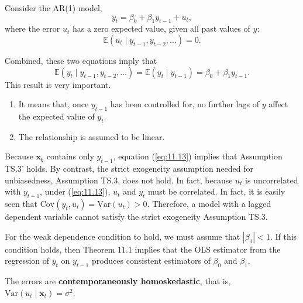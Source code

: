 \documentclass[a4paper, 10pt]{article}
\theoremstyle{definition}	%
\begin{document}
\begin{tcolorbox}[colback=gray!10!white, colframe=gray!40!black, title=Example 11.3 -- AR(1) Model]
Consider the AR(1) model,
\begin{equation}
y_t = \beta_0 + \beta_1 y_{t-1} + u_t,
\label{eq:11.12}
\end{equation}
where the error \( u_t \) has a zero expected value, given all past values of \( y \):
\begin{equation}
\mathbb{E}(u_t \mid y_{t-1}, y_{t-2}, \ldots ) = 0.
\label{eq:11.13}
\end{equation}

Combined, these two equations imply that
\begin{equation}
\mathbb{E}(y_t \mid y_{t-1}, y_{t-2}, \ldots ) = \mathbb{E}(y_t \mid y_{t-1}) = \beta_0 + \beta_1 y_{t-1}.
\label{eq:11.14}
\end{equation}
This result is very important.
\begin{enumerate}
    \item It means that, once \( y_{t-1} \) has been controlled for, no further lags of \( y \) affect the expected value of \( y_t \).
    \item The relationship is assumed to be linear.
\end{enumerate}
Because \( \mathbf{x_t} \) contains only \( y_{t-1} \), equation (\ref{eq:11.13}) implies that Assumption TS.3' holds. By contrast, the strict exogeneity assumption needed for unbiasedness, Assumption TS.3, does not hold.
In fact, because \( u_t \) is uncorrelated with \( y_{t-1} \), under (\ref{eq:11.13}), \( u_{t} \) and \( y_t \) must be correlated. 
In fact, it is easily seen that \( \text{Cov}(y_t, u_{t}) = \text{Var}(u_{t}) > 0 \). Therefore, a model with a lagged dependent variable cannot satisfy the strict exogeneity Assumption TS.3.
\end{tcolorbox}
For the weak dependence condition to hold, we must assume that \( |\beta_1| < 1 \). If this condition holds, then Theorem 11.1 implies that the OLS estimator from the regression of \( y_t \) on \( y_{t-1} \) produces consistent estimators of \( \beta_0 \) and \( \beta_1 \).

\begin{tcolorbox}[colback=blue!5!white, colframe=blue!80!black, title=Assumption TS.4' -- Homoskedasticity]
The errors are \textbf{contemporaneously homoskedastic}, that is, \( \text{Var}(u_t \mid \mathbf{x}_t) = \sigma^2 \).
\end{tcolorbox}
\end{document}
